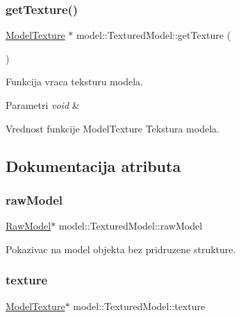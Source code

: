 \subsubsection{\texorpdfstring{get\+Texture()}{getTexture()}}
{\footnotesize\ttfamily \hyperlink{classtexture_1_1ModelTexture}{Model\+Texture} $\ast$ model\+::\+Textured\+Model\+::get\+Texture (\begin{DoxyParamCaption}\item[{void}]{ }\end{DoxyParamCaption})}



Funkcija vraca teksturu modela. 


\begin{DoxyParams}{Parametri}
{\em void} & \\
\hline
\end{DoxyParams}
\begin{DoxyReturn}{Vrednost funkcije}
Model\+Texture Tekstura modela. 
\end{DoxyReturn}


\subsection{Dokumentacija atributa}
\mbox{\label{classmodel_1_1TexturedModel_ac6157368c7e55a78aa02f9546f5f2dc3}} 
\subsubsection{\texorpdfstring{raw\+Model}{rawModel}}
{\footnotesize\ttfamily \hyperlink{classmodel_1_1RawModel}{Raw\+Model}$\ast$ model\+::\+Textured\+Model\+::raw\+Model\hspace{0.3cm}{\ttfamily [private]}}



Pokazivac na model objekta bez pridruzene strukture. 

\mbox{\label{classmodel_1_1TexturedModel_aad9aacee1ff02e44bd8ee9daff22f817}} 
\subsubsection{\texorpdfstring{texture}{texture}}
{\footnotesize\ttfamily \hyperlink{classtexture_1_1ModelTexture}{Model\+Texture}$\ast$ model\+::\+Textured\+Model\+::texture\hspace{0.3cm}{\ttfamily [private]}}



